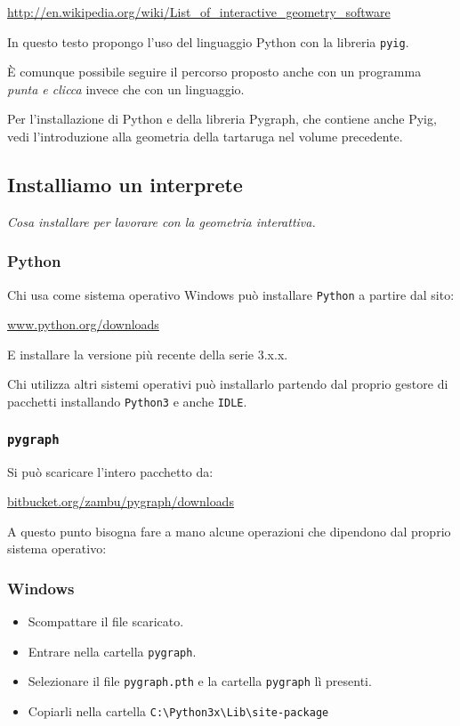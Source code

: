 \url{http://en.wikipedia.org/wiki/List_of_interactive_geometry_software}

In questo testo propongo l'uso del linguaggio
Python con la libreria \texttt{pyig}.

È comunque possibile seguire il percorso proposto anche con un programma
\emph{punta e clicca} invece che con un linguaggio.

Per l'installazione di Python e della libreria Pygraph, che contiene anche
Pyig, vedi l'introduzione alla geometria della tartaruga nel volume
precedente.

\subsection{Installiamo un interprete}
\label{sec:05_02installazione}

\emph{Cosa installare per lavorare con la geometria interattiva.}

\subsubsection{Python}

Chi usa come sistema operativo Windows può installare \texttt{Python} 
a partire dal sito:

\url{www.python.org/downloads}

E installare la versione più recente della serie 3.x.x.

Chi utilizza altri sistemi operativi può installarlo partendo dal proprio
gestore di pacchetti installando \texttt{Python3} e anche \texttt{IDLE}.

\subsubsection{\texttt{pygraph}}

Si può scaricare l'intero pacchetto da:

\url{bitbucket.org/zambu/pygraph/downloads}

A questo punto bisogna fare a mano alcune operazioni che dipendono dal 
proprio sistema operativo:

\subsubsection*{Windows}

\begin{itemize} [noitemsep]
\item {} Scompattare il file scaricato.
\item {} Entrare nella cartella \texttt{pygraph}.
\item {} Selezionare il file \texttt{pygraph.pth} e la cartella 
  \texttt{pygraph} lì presenti.
\item {} Copiarli nella cartella 
\texttt{C:\textbackslash Python3x\textbackslash Lib\textbackslash site-package}
\end{itemize}

